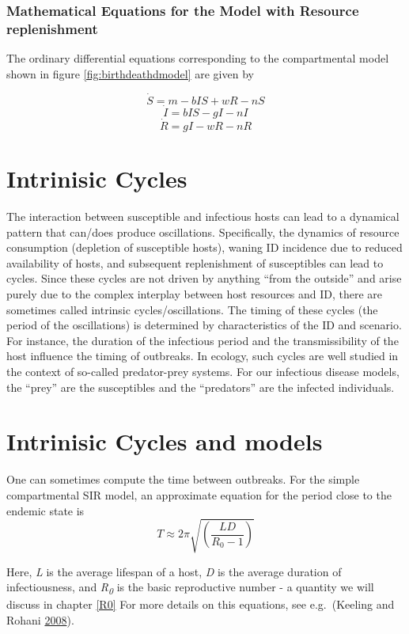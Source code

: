 \documentclass[
]{book}
\begin{document}
\hypertarget{myadvancedbox}{%
\subsubsection{Mathematical Equations for the Model with Resource replenishment}\label{myadvancedbox}}

The ordinary differential equations corresponding to the compartmental model shown in figure \ref{fig:birthdeathdmodel} are given by

\[\dot S = m - b I S + wR - n S \]
\[\dot I = b IS - gI - n I \]
\[\dot R =  gI - wR - n R\]

\hypertarget{intrinisic-cycles}{%
\section{Intrinisic Cycles}\label{intrinisic-cycles}}

The interaction between susceptible and infectious hosts can lead to a dynamical pattern that can/does produce oscillations. Specifically, the dynamics of resource consumption (depletion of susceptible hosts), waning ID incidence due to reduced availability of hosts, and subsequent replenishment of susceptibles can lead to cycles. Since these cycles are not driven by anything ``from the outside'' and arise purely due to the complex interplay between host resources and ID, there are sometimes called intrinsic cycles/oscillations. The timing of these cycles (the period of the oscillations) is determined by characteristics of the ID and scenario. For instance, the duration of the infectious period and the transmissibility of the host influence the timing of outbreaks. In ecology, such cycles are well studied in the context of so-called predator-prey systems. For our infectious disease models, the ``prey'' are the susceptibles and the ``predators'' are the infected individuals.

\hypertarget{intrinisic-cycles-and-models}{%
\section{Intrinisic Cycles and models}\label{intrinisic-cycles-and-models}}

One can sometimes compute the time between outbreaks. For the simple compartmental SIR model, an approximate equation for the period close to the endemic state is
\[T \approx 2 \pi \sqrt{\left( \frac{LD}{R_0 - 1} \right)}\]

Here, \emph{L} is the average lifespan of a host, \emph{D} is the average duration of infectiousness, and \emph{R\textsubscript{0}} is the basic reproductive number - a quantity we will discuss in chapter \ref{R0} For more details on this equations, see e.g.~(Keeling and Rohani \protect\hyperlink{ref-keeling08}{2008}).
\end{document}
